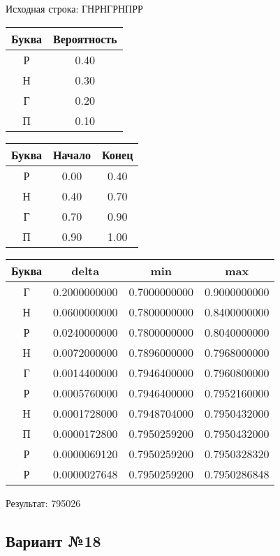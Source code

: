 \documentclass[a4paper, 12pt]{article}
\begin{document}
Исходная строка: ГНРНГРНПРР\
\begin{center}
 \begin{tabular}{ |c|c| } 
  \hline
     Буква & Вероятность \\ \hline
Р & 0.40\\\hline
Н & 0.30\\\hline
Г & 0.20\\\hline
П & 0.10
\\ \hline \end{tabular}
\end{center}
\begin{center}
 \begin{tabular}{ |c|c|c| } 
  \hline
     Буква & Начало & Конец \\ \hline
Р & 0.00 & 0.40\\\hline
Н & 0.40 & 0.70\\\hline
Г & 0.70 & 0.90\\\hline
П & 0.90 & 1.00
\\ \hline \end{tabular}
\end{center}
\begin{center}
 \begin{tabular}{ |c|c|c|c| } 
  \hline
     Буква & delta & min & max \\ \hline
Г & 0.2000000000 & 0.7000000000 & 0.9000000000\\\hline
Н & 0.0600000000 & 0.7800000000 & 0.8400000000\\\hline
Р & 0.0240000000 & 0.7800000000 & 0.8040000000\\\hline
Н & 0.0072000000 & 0.7896000000 & 0.7968000000\\\hline
Г & 0.0014400000 & 0.7946400000 & 0.7960800000\\\hline
Р & 0.0005760000 & 0.7946400000 & 0.7952160000\\\hline
Н & 0.0001728000 & 0.7948704000 & 0.7950432000\\\hline
П & 0.0000172800 & 0.7950259200 & 0.7950432000\\\hline
Р & 0.0000069120 & 0.7950259200 & 0.7950328320\\\hline
Р & 0.0000027648 & 0.7950259200 & 0.7950286848
\\ \hline \end{tabular}
\end{center}
Результат: 795026
\pagebreak
\subsection{Вариант №18}
\end{document}

